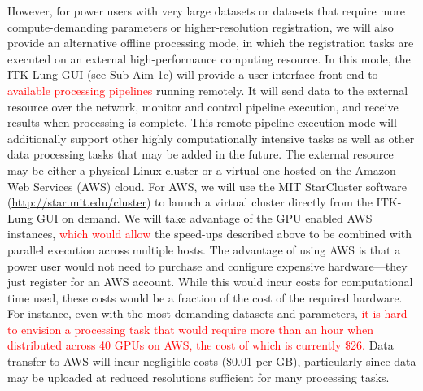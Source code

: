\documentclass[11pt,]{article}
\begin{document}
However, for power users with very large datasets or datasets that
require more compute-demanding parameters or higher-resolution
registration, we will also provide an alternative offline processing
mode, in which the registration tasks are executed on an external
high-performance computing resource. In this mode, the ITK-Lung GUI (see
Sub-Aim 1c) will provide a user interface front-end to
\textcolor{red}{available processing pipelines} running remotely. It
will send data to the external resource over the network, monitor and
control pipeline execution, and receive results when processing is
complete. This remote pipeline execution mode will additionally support
other highly computationally intensive tasks as well as other data
processing tasks that may be added in the future. The external resource
may be either a physical Linux cluster or a virtual one hosted on the
Amazon Web Services (AWS) cloud. For AWS, we will use the MIT
StarCluster software (\url{http://star.mit.edu/cluster}) to launch a
virtual cluster directly from the ITK-Lung GUI on demand. We will take
advantage of the GPU enabled AWS instances,
\textcolor{red}{which would allow} the speed-ups described above to be
combined with parallel execution across multiple hosts. The advantage of
using AWS is that a power user would not need to purchase and configure
expensive hardware---they just register for an AWS account. While this
would incur costs for computational time used, these costs would be a
fraction of the cost of the required hardware. For instance, even with
the most demanding datasets and parameters,
\textcolor{red}{it is hard to envision a processing task that would require
more than an hour when distributed across 40 GPUs on AWS, the cost of which is currently \$26.}
Data transfer to AWS will incur negligible costs (\$0.01 per GB),
particularly since data may be uploaded at reduced resolutions
sufficient for many processing tasks.
\end{document}
